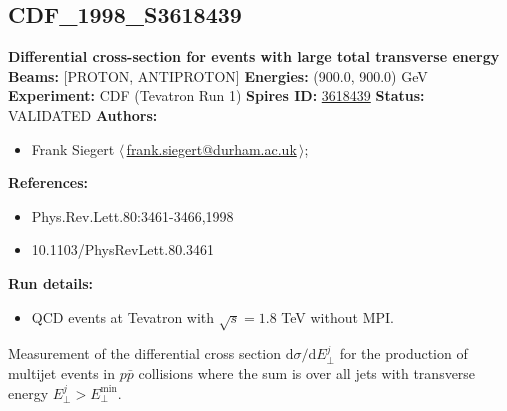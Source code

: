 \subsection[CDF\_1998\_S3618439]{CDF\_1998\_S3618439\,\cite{Abe:1997eua}}
\textbf{Differential cross-section for events with large total transverse energy}\newline
\textbf{Beams:} [PROTON, ANTIPROTON] \newline
\textbf{Energies:} (900.0, 900.0) GeV \newline
\textbf{Experiment:} CDF (Tevatron Run 1) \newline
\textbf{Spires ID:} \href{http://www.slac.stanford.edu/spires/find/hep/www?rawcmd=key+3618439}{3618439}\newline
\textbf{Status:} VALIDATED\newline
\textbf{Authors:}
\begin{itemize}
  \item Frank Siegert $\langle\,$\href{mailto:frank.siegert@durham.ac.uk}{frank.siegert@durham.ac.uk}$\,\rangle$;
\end{itemize}
\textbf{References:}
\begin{itemize}
  \item Phys.Rev.Lett.80:3461-3466,1998
  \item 10.1103/PhysRevLett.80.3461
\end{itemize}
\textbf{Run details:}
\begin{itemize}

  \item QCD events at Tevatron with $\sqrt{s}=1.8$ TeV without MPI.\end{itemize}

\noindent Measurement of the differential cross section $\mathrm{d}\sigma/\mathrm{d}E_\perp^j$ for the production of multijet events in $p\bar{p}$ collisions where the sum is over all jets with transverse energy $E_\perp^j > E_\perp^\mathrm{min}$.

\clearpage


\clearpage

